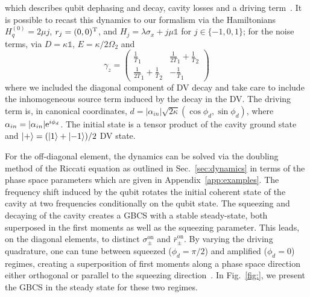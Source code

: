 \documentclass[%
reprint,
superscriptaddress,
nofootinbib,
 amsmath,amssymb,
prx,
floatfix,
]{revtex4-2}
\begin{document}
which describes qubit dephasing and decay, cavity losses and a driving term~\cite{eddins_high_2019}. It is possible to recast this dynamics to our formalism via the Hamiltonians $H_q^{(0)} = 2 \mu j $,  $r_j = (0,0)^{\rm T} $, and $H_j= \lambda \sigma_x + j \mu \mathds{1}$ for $j \in \{-1,0,1\}$; for the noise terms, via $D = \kappa \mathds{1}$, $E = \kappa/2 \Omega_2$ and 
\begin{equation}\gamma_z = 
    \begin{pmatrix}
        \frac{1}{T}_1 & \frac{1}{2 T}_1+\frac{1}{T}_2 \\
        \frac{1}{2 T}_1+\frac{1}{T}_2 & - \frac{1}{T}_1
    \end{pmatrix}
\end{equation}
where we included the diagonal component of DV decay and take care to include the inhomogeneous source term induced by the decay in the DV. The driving term is, in canonical coordinates, $d = |\alpha_{in}| \sqrt{2 \kappa}(\cos \phi_d, \sin \phi_d )$, where $\alpha_{in}=|\alpha_{in}|{\rm e}^{i\phi_d}$. The initial state is a tensor product of the cavity ground state and $\ket{+}  = (\ket{1}+\ket{-1})/2$ DV state.

 



For the off-diagonal element, the dynamics can be solved via the doubling method of the Riccati equation as outlined in Sec.~\ref{sec:dynamics} in terms of the phase space parameters which are given in Appendix~\ref{app:examples}. The frequency shift induced by the qubit rotates the initial coherent state of the cavity at two frequencies conditionally on the qubit state. The squeezing and decaying of the cavity creates a GBCS with a stable steady-state, both superposed in the first moments as well as the squeezing parameter. This leads, on the diagonal elements, to distinct $\sigma^{\text{on}}_{\pm}$ and $\bar{r}^{\text{on}}_{\pm}$. By varying the driving quadrature, one can tune between squeezed ($\phi_d = \pi/2$) and amplified ($\phi_d = 0$) regimes, creating a superposition of first moments along a phase space direction either orthogonal or parallel to the squeezing direction~\cite{eddins_high_2019}. In Fig.~\ref{fig:},  we present the GBCS in the steady state for these two regimes. 
\end{document}
